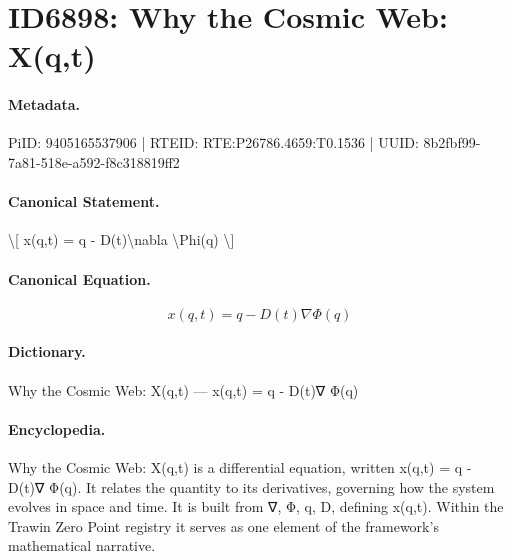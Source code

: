 \section*{ID6898: Why the Cosmic Web: X(q,t)}
\paragraph{Metadata.}
PiID: 9405165537906 | RTEID: RTE:P26786.4659:T0.1536 | UUID: 8b2fbf99-7a81-518e-a592-f8c318819ff2

\paragraph{Canonical Statement.}
\textbackslash{}[ x(q,t) = q - D(t)\textbackslash{}nabla \textbackslash{}Phi(q) \textbackslash{}]

\paragraph{Canonical Equation.}
\[
x(q,t) = q - D(t)\nabla \Phi(q)
\]

\paragraph{Dictionary.}
Why the Cosmic Web: X(q,t) — x(q,t) = q - D(t)∇ Φ(q)

\paragraph{Encyclopedia.}
Why the Cosmic Web: X(q,t) is a differential equation, written x(q,t) = q - D(t)∇ Φ(q). It relates the quantity to its derivatives, governing how the system evolves in space and time. It is built from ∇, Φ, q, D, defining x(q,t). Within the Trawin Zero Point registry it serves as one element of the framework's mathematical narrative.
